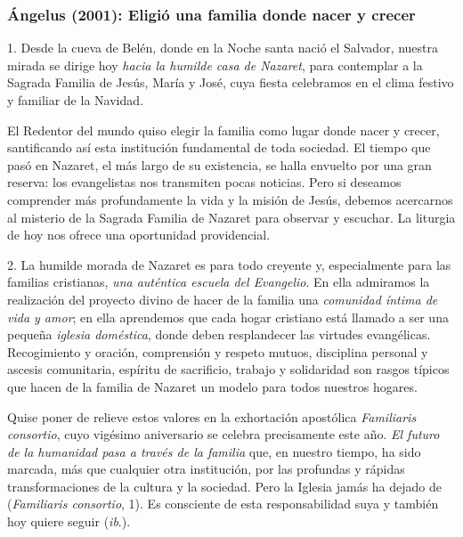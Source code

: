 			\subsubsection{Ángelus (2001): Eligió una familia donde nacer y crecer}
			
				
				\begin{body}
					1. Desde la cueva de Belén, donde en la Noche santa nació el Salvador, nuestra mirada se dirige hoy \emph{hacia la humilde casa de Nazaret}, para contemplar a la Sagrada Familia de Jesús, María y José, cuya fiesta celebramos en el clima festivo y familiar de la Navidad.
					
					El Redentor del mundo quiso elegir la familia como lugar donde nacer y crecer, santificando así esta institución fundamental de toda sociedad. El tiempo que pasó en Nazaret, el más largo de su existencia, se halla envuelto por una gran reserva: los evangelistas nos transmiten pocas noticias. Pero si deseamos comprender más profundamente la vida y la misión de Jesús, debemos acercarnos al misterio de la Sagrada Familia de Nazaret para observar y escuchar. La liturgia de hoy nos ofrece una oportunidad providencial.
					
					2. La humilde morada de Nazaret es para todo creyente y, especialmente para las familias cristianas, \emph{una auténtica escuela del Evangelio}. En ella admiramos la realización del proyecto divino de hacer de la familia una \emph{comunidad íntima de vida y amor}; en ella aprendemos que cada hogar cristiano está llamado a ser una pequeña \emph{iglesia doméstica}, donde deben resplandecer las virtudes evangélicas. Recogimiento y oración, comprensión y respeto mutuos, disciplina personal y ascesis comunitaria, espíritu de sacrificio, trabajo y solidaridad son rasgos típicos que hacen de la familia de Nazaret un modelo para todos nuestros hogares.
					
					Quise poner de relieve estos valores en la exhortación apostólica \emph{Familiaris consortio}, cuyo vigésimo aniversario se celebra precisamente este año. \emph{El futuro de la humanidad pasa a través de la familia} que, en nuestro tiempo, ha sido marcada, más que cualquier otra institución, por las profundas y rápidas transformaciones de la cultura y la sociedad. Pero la Iglesia jamás ha dejado de  (\emph{Familiaris consortio}, 1). Es consciente de esta responsabilidad suya y también hoy quiere seguir  (\emph{ib}.).
					

\end{body}

